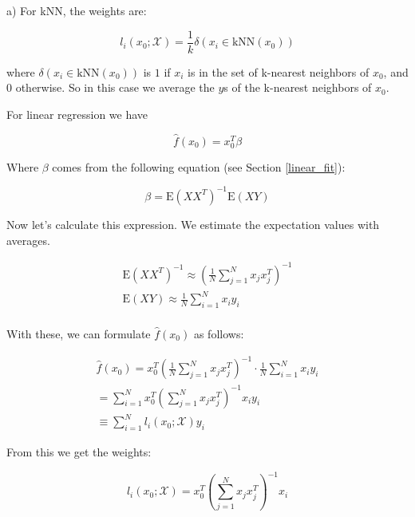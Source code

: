 \documentclass{article}
\begin{document}
a) For kNN, the weights are:


\begin{equation}
    l_i(x_0;\mathcal{X}) = \frac{1}{k} \delta(x_i \in \text{kNN}(x_0))
\end{equation}

where $\delta(x_i \in \text{kNN}(x_0))$ is $1$ if $x_i$ is in the set of k-nearest neighbors of $x_0$, and $0$ otherwise. So in this case we average the $y$s of the k-nearest neighbors of $x_0$.

For linear regression we have

\begin{equation}
    \hat{f}(x_0) = x_0^T \beta
\end{equation}

Where $\beta$ comes from  the following equation (see Section \ref{linear_fit}):

\begin{equation}
    \beta = \text{E}(XX^T)^{-1}\text{E}(XY)
\end{equation}

Now let's calculate this expression. We estimate the expectation values with averages.

\begin{equation}
    \begin{split}
        \text{E}(XX^T)^{-1} \approx \left( \frac{1}{N}\sum_{j=1}^{N}x_j x^T_j\right)^{-1}\\
        \text{E}(XY) \approx \frac{1}{N}\sum_{i=1}^{N}x_i y_i\\
    \end{split}
\end{equation}

With these, we can formulate $\hat{f}(x_0)$ as follows:

\begin{equation}
  \begin{split}
    \hat{f}(x_0) = x^T_0 \left( \frac{1}{N}\sum_{j=1}^{N}x_j x^T_j\right)^{-1} \cdot \frac{1}{N}\sum_{i=1}^{N}x_i y_i\\
    = \sum_{i=1}^{N} x^T_0 \left( \sum_{j=1}^{N} x_j x^T_j \right)^{-1} x_i y_i \\
    \equiv \sum_{i=1}^{N} l_i(x_0;\mathcal{X}) y_i
  \end{split}
\end{equation}

From this we get the weights:

\begin{equation}
    l_i(x_0; \mathcal{X}) = x^T_0 \left( \sum_{j=1}^{N} x_j x^T_j \right)^{-1} x_i
\end{equation}
\end{document}

